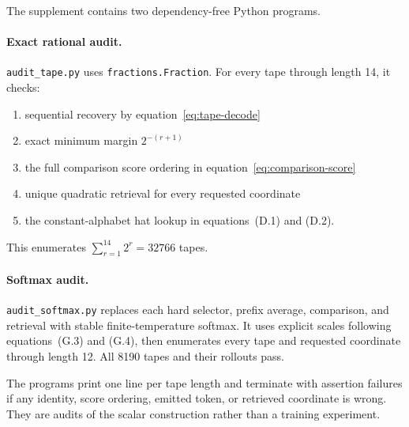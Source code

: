 The supplement contains two dependency-free Python programs.

\paragraph{Exact rational audit.}
\texttt{audit\_tape.py} uses \texttt{fractions.Fraction}. For every tape through length 14, it
checks:
\begin{enumerate}[leftmargin=*]
 \item sequential recovery by equation~\eqref{eq:tape-decode}
 \item exact minimum margin $2^{-(r+1)}$
 \item the full comparison score ordering in equation~\eqref{eq:comparison-score}
 \item unique quadratic retrieval for every requested coordinate
 \item the constant-alphabet hat lookup in equations~(D.1) and (D.2).
\end{enumerate}
This enumerates $\sum_{r=1}^{14}2^r=32766$ tapes.

\paragraph{Softmax audit.}
\texttt{audit\_softmax.py} replaces each hard selector, prefix average, comparison, and retrieval
with stable finite-temperature softmax. It uses explicit scales following equations~(G.3) and
(G.4), then enumerates every tape and requested coordinate through length 12. All 8190 tapes and
their rollouts pass.

The programs print one line per tape length and terminate with assertion failures if any identity,
score ordering, emitted token, or retrieved coordinate is wrong. They are audits of the scalar
construction rather than a training experiment.
